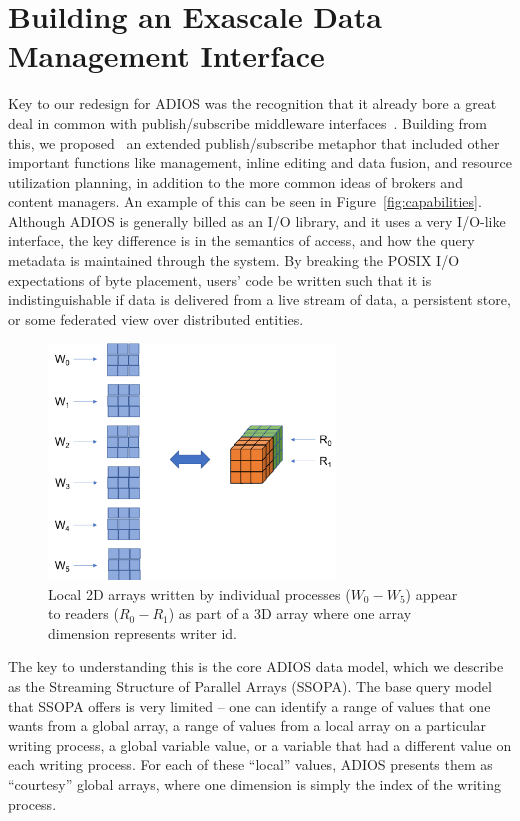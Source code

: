 \section{Building an Exascale Data Management Interface 
}
\label{sec:models}




Key to our redesign for ADIOS was the recognition that it already bore a great deal in common with publish/subscribe middleware interfaces~\cite{Flexpath}.  Building from this, we proposed~\cite{ViewfromORNL} an extended publish/subscribe metaphor that included other important functions like management, inline editing and data fusion, and resource utilization planning, in addition to the more common ideas of brokers and content managers.  An example of this can be seen in Figure~\ref{fig:capabilities}.  Although ADIOS is generally billed as an I/O library, and it uses a very I/O-like interface, the key difference is in the semantics of access, and how the query metadata is maintained through the system.  By breaking the POSIX I/O expectations of byte placement, users' code be written such that it is indistinguishable if data is delivered from a live stream of data, a persistent store, or some federated view over distributed entities.


\begin{figure}
\includegraphics[width=3in]{figs/write_read_locals.png}
\caption{Local 2D arrays written by individual processes ($W_0-W_5$) appear to readers ($R_0-R_1$) as part of a 3D array where one array dimension represents writer id.}\label{fig:read-write-locals}
\end{figure}
The key to understanding this is the core ADIOS data model, which we describe as the Streaming Structure of Parallel Arrays (SSOPA).  The base query model that SSOPA offers is very limited -- one can identify a range of values that one wants from a global array, a range of values from a local array on a particular writing process, a global variable value, or a variable that had a different value on each writing process.  For each of these ``local'' values, ADIOS presents them as ``courtesy'' global arrays, where one dimension is simply the index of the writing process. 

